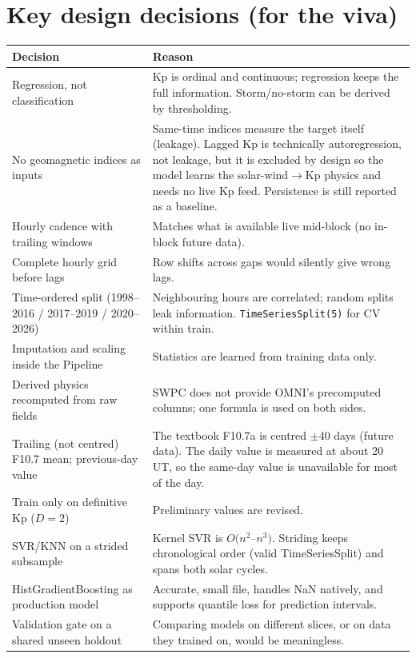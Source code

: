 \documentclass[11pt,a4paper]{article}
\newcommand{\code}[1]{\texttt{#1}}
\begin{document}
\section{Key design decisions (for the viva)}
\begin{longtable}{p{4.6cm}p{11.2cm}}\toprule
Decision & Reason\\\midrule\endhead
Regression, not classification & Kp is ordinal and continuous; regression keeps the full information. Storm/no-storm can be derived by thresholding.\\
No geomagnetic indices as inputs & Same-time indices measure the target itself (leakage). Lagged Kp is technically autoregression, not leakage, but it is excluded by design so the model learns the solar-wind$\rightarrow$Kp physics and needs no live Kp feed. Persistence is still reported as a baseline.\\
Hourly cadence with trailing windows & Matches what is available live mid-block (no in-block future data).\\
Complete hourly grid before lags & Row shifts across gaps would silently give wrong lags.\\
Time-ordered split (1998--2016 / 2017--2019 / 2020--2026) & Neighbouring hours are correlated; random splits leak information. \code{TimeSeriesSplit(5)} for CV within train.\\
Imputation and scaling inside the Pipeline & Statistics are learned from training data only.\\
Derived physics recomputed from raw fields & SWPC does not provide OMNI's precomputed columns; one formula is used on both sides.\\
Trailing (not centred) F10.7 mean; previous-day value & The textbook F10.7a is centred $\pm$40 days (future data). The daily value is measured at about 20\,UT, so the same-day value is unavailable for most of the day.\\
Train only on definitive Kp ($D=2$) & Preliminary values are revised.\\
SVR/KNN on a strided subsample & Kernel SVR is $O(n^2$--$n^3)$. Striding keeps chronological order (valid TimeSeriesSplit) and spans both solar cycles.\\
HistGradientBoosting as production model & Accurate, small file, handles NaN natively, and supports quantile loss for prediction intervals.\\
Validation gate on a shared unseen holdout & Comparing models on different slices, or on data they trained on, would be meaningless.\\

\end{longtable}
\end{document}
